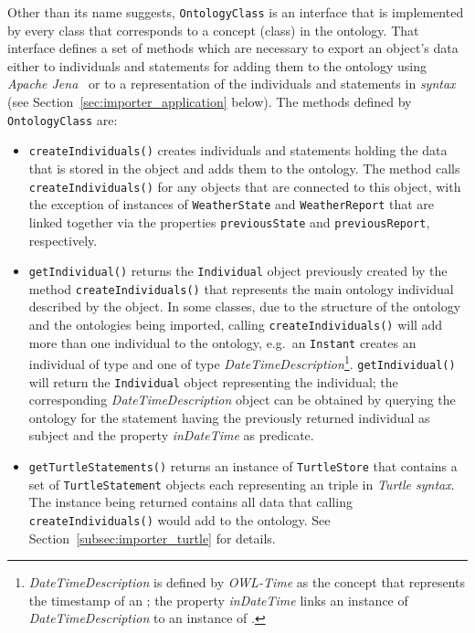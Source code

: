 Other than its name suggests, \texttt{OntologyClass} is an interface that is implemented by every class that corresponds to a concept (class) in the ontology. That interface defines a set of methods which are necessary to export an object's data either to individuals and statements for adding them to the ontology using \emph{Apache Jena}~\cite{apache_jena} or to a representation of the individuals and statements in \emph{ syntax} (see Section~\ref{sec:importer_application} below). The methods defined by \texttt{OntologyClass} are:
\begin{itemize}
  \item \texttt{createIndividuals()} creates individuals and statements holding the data that is stored in the object and adds them to the ontology. The method calls \texttt{createIndividuals()} for any objects that are connected to this object, with the exception of instances of \texttt{Weather\hspace{0pt}State} and \texttt{Weather\hspace{0pt}Report} that are linked together via the properties \texttt{previousState} and \texttt{previousReport}, respectively.
  
  \item \texttt{getIndividual()} returns the \texttt{Individual} object previously created by the method \texttt{createIndividuals()} that represents the main ontology individual described by the object. In some classes, due to the structure of the \smarthomeweather ontology and the ontologies being imported, calling \texttt{createIndividuals()} will add more than one individual to the ontology, e.g.\ an \texttt{Instant} creates an individual of type  and one of type \emph{DateTimeDescription}\footnote{\emph{DateTimeDescription} is defined by \emph{OWL-Time} as the concept that represents the timestamp of an ; the property \emph{inDateTime} links an instance of \emph{DateTimeDescription} to an instance of .}. \texttt{getIndividual()} will return the \texttt{Individual} object representing the  individual; the corresponding \emph{DateTimeDescription} object can be obtained by querying the ontology for the statement having the previously returned
   individual as subject and the property \emph{inDateTime} as predicate.
  
  \item \texttt{getTurtleStatements()} returns an instance of \texttt{TurtleStore} that contains a set of \texttt{TurtleStatement} objects each representing an  triple in \emph{\acs{Turtle} syntax}. The instance being returned contains all data that calling \texttt{createIndividuals()} would add to the ontology. See Section~\ref{subsec:importer_turtle} for details.
  

\end{itemize}
